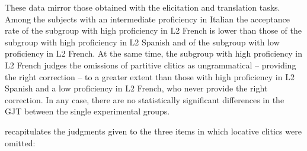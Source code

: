 \documentclass[output=paper,modfonts,nonflat,newtxmath]{langsci/langscibook}
\begin{document}
\begin{table}
\caption{\label{tab:sciutti:4} Judgments on items including an omission of a partitive clitic (ungrammatical)}
\end{table}
These data mirror those obtained with the elicitation and translation tasks. Among the subjects with an intermediate proficiency in Italian the acceptance rate of the subgroup with high proficiency in L2 French is lower than those of the subgroup with high proficiency in L2 Spanish and of the subgroup with low proficiency in L2 French. At the same time, the subgroup with high proficiency in L2 French  judges the omissions of partitive clitics as ungrammatical – providing the right correction – to a greater extent than those with high proficiency in L2 Spanish and a low proficiency in L2 French, who never provide the right correction. In any case, there are no statistically significant differences in the GJT between the single experimental groups.

 recapitulates the judgments given to the three items in which locative clitics were omitted:
\end{document}
